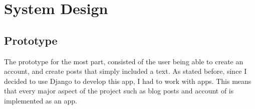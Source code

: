 
\chapter {System Design}

\section{Prototype}
The prototype for the most part, consisted of the user being able to create an account, and create posts that simply included a text. As stated before, since I decided to use Django to develop this app, I had to work with apps. This means that every major aspect of the project such as blog posts and account of is implemented as an app.

